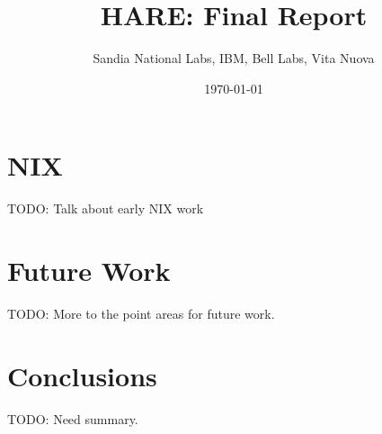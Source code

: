 \documentclass{report}
\title{HARE: Final Report}
\author{Sandia National Labs, IBM, Bell Labs, Vita Nuova}
\date{\today}
\begin{document}
\maketitle
\tableofcontents
\pagebreak







\chapter{NIX}
TODO: Talk about early NIX work
\chapter{Future Work}
TODO: More to the point areas for
future work.
\chapter{Conclusions}
TODO: Need summary.



\end{document}
